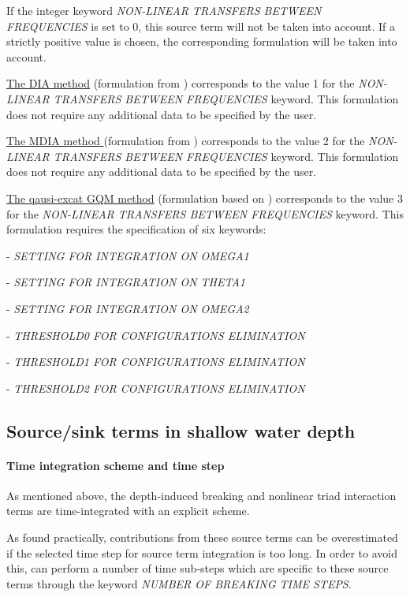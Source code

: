 If the integer keyword \textit{NON-LINEAR TRANSFERS BETWEEN FREQUENCIES} is set to 0, this source term will not be taken into account.
If a strictly positive value is chosen, the corresponding formulation will be taken into account.

\underline{  The DIA method} (formulation from \cite{Hasselmann1985_1}) corresponds to the value 1 for the \textit{NON-LINEAR TRANSFERS
  BETWEEN FREQUENCIES} keyword. This formulation does not require any additional data to be specified by the user.

\underline{The MDIA method }(formulation from \cite{Tolman2004}) corresponds to the value 2 for the \textit{NON-LINEAR TRANSFERS
  BETWEEN FREQUENCIES} keyword. This formulation does not require any additional data to be specified by the user.

\underline{The qausi-excat GQM method} (formulation based on \cite{Lavrenov2001}) corresponds to the value 3 for the \textit{NON-LINEAR
  TRANSFERS BETWEEN FREQUENCIES} keyword. This formulation requires the specification of six keywords:

- \textit{SETTING FOR INTEGRATION ON OMEGA1}

- \textit{SETTING FOR INTEGRATION ON THETA1}

- \textit{SETTING FOR INTEGRATION ON OMEGA2}

- \textit{THRESHOLD0 FOR CONFIGURATIONS ELIMINATION}

- \textit{THRESHOLD1 FOR CONFIGURATIONS ELIMINATION}

- \textit{THRESHOLD2 FOR CONFIGURATIONS ELIMINATION}


\subsection{ Source/sink terms in shallow water depth}
\label{se:sourcshallow}

\paragraph{ Time integration scheme and time step}

 As mentioned above, the depth-induced breaking and nonlinear triad interaction terms are time-integrated with an explicit scheme.

 As found practically, contributions from these source terms can be overestimated if the selected time step for source term integration
 is too long. In order to avoid this, \tomawac can perform a number of time sub-steps which are specific to these source terms through
 the keyword \textit{NUMBER OF BREAKING TIME STEPS}.

